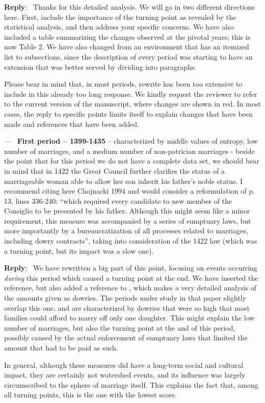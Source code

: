 \documentclass[11pt]{article}
\newcounter{reviewer}
\newcounter{point}[reviewer]
\renewcommand{\thepoint}{P\,\thereviewer.\arabic{point}}
\newenvironment{point}
   {\refstepcounter{point} \bigskip \noindent {\textbf{Reviewer~Point~\thepoint} } ---\ }
   {\par }
\newenvironment{reply}
   {\medskip \noindent \begin{sf}\textbf{Reply}:\  }
   {\medskip \end{sf}}
\begin{document}
\begin{reply}
  Thanks for this detailed analysis. We will go in two different directions
  here. First, include the importance of the turning point as revealed by the
  statistical analysis, and then address your specific concerns. We have also
  included a table summarizing the changes observed at the pivotal years; this
  is now Table 2. We have also changed from an environment that has an itemized
  list to subsections, since the description of every period was starting to
  have an extension that was better served by dividing into paragraphs.

  Please bear in mind that, in most periods, rewrite has been too extensive to
  include in this already too long response. We kindly request the reviewer to
  refer to the current version of the manuscript, where changes are shown in
  red. In most cases, the reply to specific points limits itself to explain
  changes that have been made and references that have been added.
\end{reply}

\begin{point}
  {\bf First period – 1399-1435} – characterized by middle values of entropy,
  low number of marriages, and a medium number of non-patrician marriages -
  beside the point that for this period we do not have a complete data set, we
  should bear in mind that in 1422 the Great Council further clarifies the
  status of a marriageable woman able to allow her son inherit his father’s
  noble status. I recommend citing here Chojnacki 1994 and would consider a
  reformulation of p. 13, lines 336-240: “which required every candidate to new
  member of the Consiglio to be presented by his father. Although this might
  seem like a minor requirement, this measure was accompanied by a series of
  sumptuary laws, but more importantly by a bureaucratization of all processes
  related to marriages, including dowry contracts”, taking into consideration of
  the 1422 law (which was a turning point, but its impact was a slow one).
\end{point}

\begin{reply}
We have rewritten a big part of this point, focusing on events occurring {\em
  during} this period which caused a turning point at the end. We have inserted
the reference, but also added a reference to \cite{10.2307/202860}, which makes
a very detailed analysis of the amounts given as dowries. The periods under
study in that paper slightly overlap this one, and are characterized by dowries
that were so high that most families could afford to marry off only one
daughter. This might explain the low number of marriages, but also the turning
point at the and of this period, possibly caused by the actual enforcement of
sumptuary laws that limited the amount that had to be paid as such.

In general, although these measures did have a long-term social and cultural
impact, they are certainly not watershed events, and its influence was largely
circumscribed to the sphere of marriage itself. This explains the fact that,
among all turning points, this is the one with the lowest score.
\end{reply}
\end{document}
